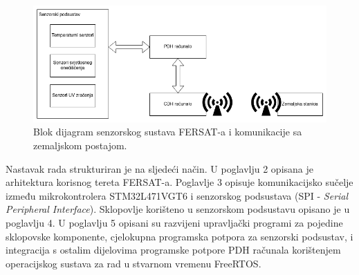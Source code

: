     \begin{figure}[htb]
        \centering
        \includegraphics[width=\textwidth]{slike/uvod_blok.png}
        \caption{Blok dijagram senzorskog sustava FERSAT-a i komunikacije sa zemaljskom postajom.}
        \label{fig:uvod_blok}
    \end{figure}
    
    Nastavak rada strukturiran je na sljedeći način. U poglavlju 2 opisana je arhitektura korisnog tereta FERSAT-a. Poglavlje 3 opisuje komunikacijsko sučelje između mikrokontrolera STM32L471VGT6 i senzorskog podsustava (SPI - \textit{Serial Peripheral Interface}). Sklopovlje korišteno u senzorskom podsustavu opisano je u poglavlju 4. U poglavlju 5 opisani su razvijeni upravljački programi za pojedine sklopovske komponente, cjelokupna programska potpora za senzorski podsustav, i integracija s ostalim dijelovima programske potpore PDH računala korištenjem operacijskog sustava za rad u stvarnom vremenu FreeRTOS.
